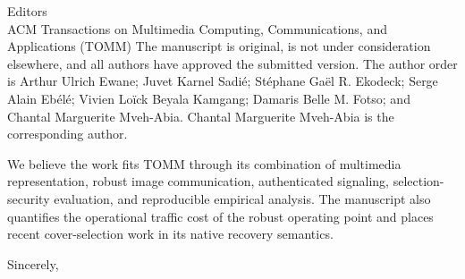 \documentclass[10pt]{letter}
\begin{document}
\begin{letter}{Editors\\ACM Transactions on Multimedia Computing, Communications, and Applications (TOMM)}
The manuscript is original, is not under consideration elsewhere, and all authors have approved the submitted version. The author order is Arthur Ulrich Ewane; Juvet Karnel Sadié; Stéphane Gaël R. Ekodeck; Serge Alain Ebélé; Vivien Loïck Beyala Kamgang; Damaris Belle M. Fotso; and Chantal Marguerite Mveh-Abia. Chantal Marguerite Mveh-Abia is the corresponding author.

We believe the work fits TOMM through its combination of multimedia representation, robust image communication, authenticated signaling, selection-security evaluation, and reproducible empirical analysis. The manuscript also quantifies the operational traffic cost of the robust operating point and places recent cover-selection work in its native recovery semantics.

\closing{Sincerely,}
\end{letter}
\end{document}

